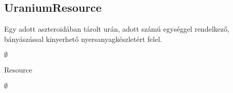 \subsection{UraniumResource}
\begin{class-template-responsibility}
Egy adott aszteroidában tárolt urán, adott számú egységgel rendelkező, bányászással kinyerhető nyersanyagkészletért felel. 
\end{class-template-responsibility}
\begin{class-template-interface}
$\emptyset$
\end{class-template-interface}
\begin{class-template-baseclass}
Resource
\end{class-template-baseclass}
\begin{class-template-attribute}
\item[] $\emptyset$
\end{class-template-attribute}
\begin{class-template-method}
\end{class-template-method}


